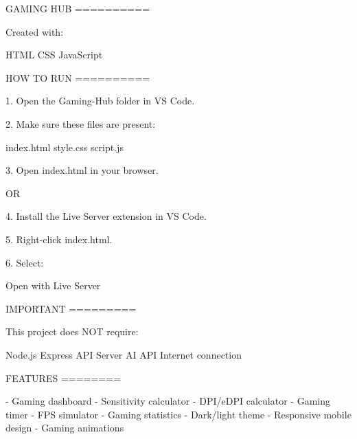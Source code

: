 GAMING HUB
==========

Created with:

HTML
CSS
JavaScript


HOW TO RUN
==========

1. Open the Gaming-Hub folder in VS Code.

2. Make sure these files are present:

   index.html
   style.css
   script.js

3. Open index.html in your browser.

OR

4. Install the Live Server extension in VS Code.

5. Right-click index.html.

6. Select:

   Open with Live Server


IMPORTANT
=========

This project does NOT require:

Node.js
Express
API
Server
AI API
Internet connection


FEATURES
========

- Gaming dashboard
- Sensitivity calculator
- DPI/eDPI calculator
- Gaming timer
- FPS simulator
- Gaming statistics
- Dark/light theme
- Responsive mobile design
- Gaming animations